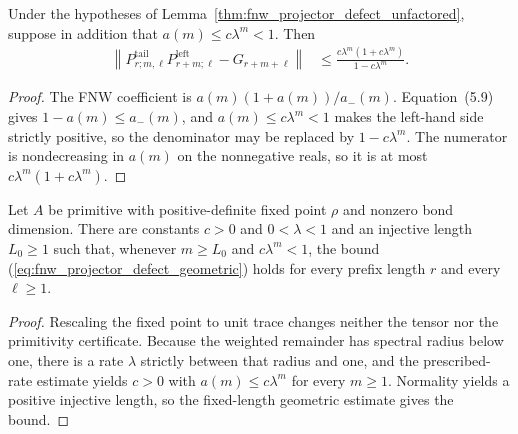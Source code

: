 \begin{lemma}
    \label{thm:fnw_projector_defect_geometric}
    \leanok
    Under the hypotheses of
    Lemma~\ref{thm:fnw_projector_defect_unfactored}, suppose in addition that
    $a(m)\leq c\lambda^m<1$.  Then
    \begin{align}
        \left\lVert
        P^{\mathrm{tail}}_{r;m,\ell}P^{\mathrm{left}}_{r+m;\ell}
        -G_{r+m+\ell}
        \right\rVert
         & \leq \frac{c\lambda^m(1+c\lambda^m)}{1-c\lambda^m}.
        \label{eq:fnw_projector_defect_geometric}
    \end{align}
\end{lemma}

\begin{proof}
    \leanok
    The FNW coefficient is $a(m)(1+a(m))/a_-(m)$.  Equation~(5.9) gives
    $1-a(m)\leq a_-(m)$, and $a(m)\leq c\lambda^m<1$ makes the left-hand side
    strictly positive, so the denominator may be replaced by $1-c\lambda^m$.
    The numerator is nondecreasing in $a(m)$ on the nonnegative reals, so it is
    at most $c\lambda^m(1+c\lambda^m)$.
\end{proof}

\begin{theorem}
    \label{thm:primitive_fnw_projector_defect_geometric}
    \leanok
    Let $A$ be primitive with positive-definite fixed point $\rho$ and nonzero
    bond dimension.  There are constants $c>0$ and $0<\lambda<1$ and an
    injective length $L_0\geq1$ such that, whenever $m\geq L_0$ and
    $c\lambda^m<1$, the bound (\ref{eq:fnw_projector_defect_geometric}) holds for
    every prefix length $r$ and every $\ell\geq1$.
\end{theorem}

\begin{proof}
    \leanok
    Rescaling the fixed point to unit trace changes neither the tensor nor
    the primitivity certificate.  Because the weighted remainder has spectral
    radius below one, there is a rate $\lambda$ strictly between that radius
    and one, and the prescribed-rate estimate yields $c>0$ with
    $a(m)\leq c\lambda^m$ for every $m\geq1$.  Normality yields a positive
    injective length, so the fixed-length geometric estimate gives the bound.
\end{proof}

